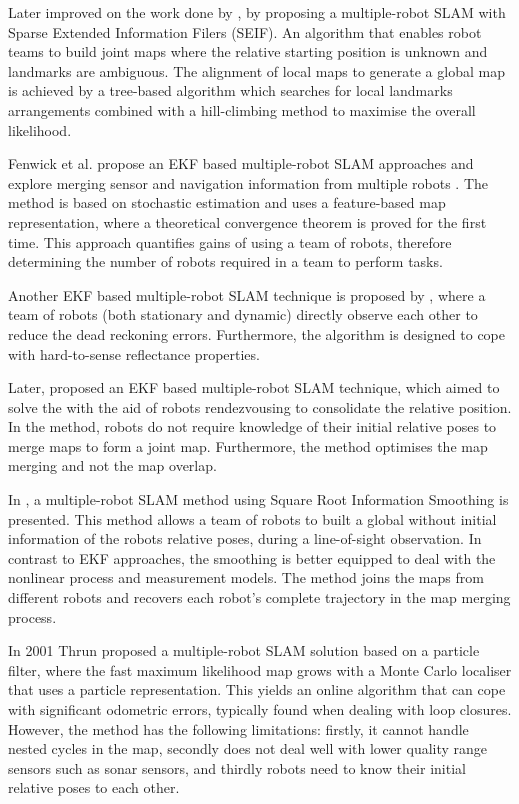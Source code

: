 Later \cite{Thrun2005} improved on the work done by \cite{Nettleton2000}, by proposing a multiple-robot SLAM with Sparse Extended Information Filers (SEIF). An algorithm that enables robot teams to build joint maps where the relative starting position is unknown and landmarks are ambiguous. The alignment of local maps to generate a global map is achieved by a tree-based algorithm which searches for local landmarks arrangements combined with a hill-climbing method to maximise the overall likelihood. 

Fenwick et al. propose an EKF based multiple-robot SLAM approaches and explore merging sensor and navigation information from multiple robots \cite{Fenwick2003}. The method is based on stochastic estimation and uses a feature-based map representation, where a theoretical convergence theorem is proved for the first time. This approach quantifies gains of using a team of robots, therefore determining the number of robots required in a team to perform tasks.

Another EKF based multiple-robot SLAM technique is proposed by \cite{Rekleitis2001}, where a team of robots (both stationary and dynamic) directly observe each other to reduce the dead reckoning errors. Furthermore, the algorithm is designed to cope with hard-to-sense reflectance properties. 

Later, \cite{4058636} proposed an EKF based multiple-robot SLAM technique, which aimed to solve the with the aid of robots rendezvousing to consolidate the relative position. In the method, robots do not require knowledge of their initial relative poses to merge maps to form a joint map. Furthermore, the method optimises the map merging and not the map overlap. 

In \cite{Andersson2008}, a multiple-robot SLAM method using Square Root Information Smoothing is presented. This method allows a team of robots to built a global without initial information of the robots relative poses, during a line-of-sight observation. In contrast to EKF approaches, the smoothing is better equipped to deal with the nonlinear process and measurement models. The method joins the maps from different robots and recovers each robot's complete trajectory in the map merging process.

In 2001 Thrun \cite{thrun2001a} proposed a multiple-robot SLAM solution based on a particle filter, where the fast maximum likelihood map grows with a Monte Carlo localiser that uses a particle representation. This yields an online algorithm that can cope with significant odometric errors, typically found when dealing with loop closures. However, the method has the following limitations: firstly, it cannot handle nested cycles in the map, secondly does not deal well with lower quality range sensors such as sonar sensors, and thirdly robots need to know their initial relative poses to each other.  

